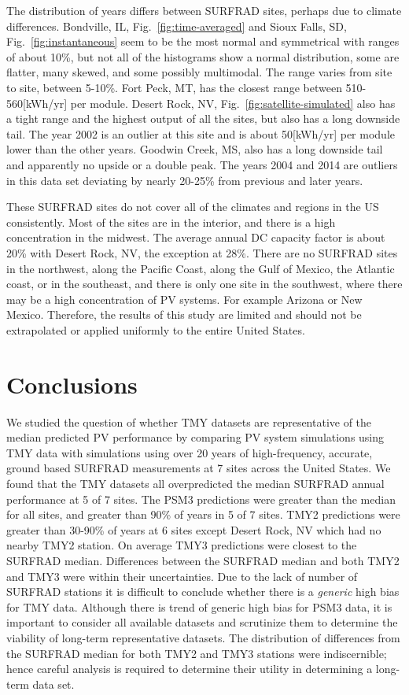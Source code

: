 \documentclass[conference]{IEEEtran}
\begin{document}
The distribution of years differs between SURFRAD sites, perhaps due to climate differences. Bondville, IL, Fig.~\ref{fig:time-averaged} and Sioux Falls, SD, Fig.~\ref{fig:instantaneous} seem to be the most normal and symmetrical with ranges of about 10\%, but not all of the histograms show a normal distribution, some are flatter, many skewed, and some possibly multimodal. The range varies from site to site, between 5-10\%. Fort Peck, MT, has the closest range between 510-560[kWh/yr] per module. Desert Rock, NV, Fig.~\ref{fig:satellite-simulated} also has a tight range and the highest output of all the sites, but also has a long downside tail. The year 2002 is an outlier at this site and is about 50[kWh/yr] per module lower than the other years. Goodwin Creek, MS, also has a long downside tail and apparently no upside or a double peak. The years 2004 and 2014 are outliers in this data set deviating by nearly 20-25\% from previous and later years.

These SURFRAD sites do not cover all of the climates and regions in the US consistently. Most of the sites are in the interior, and there is a high concentration in the midwest. The average annual DC capacity factor is about 20\% with Desert Rock, NV, the exception at 28\%. There are no SURFRAD sites in the northwest, along the Pacific Coast, along the Gulf of Mexico, the Atlantic coast, or in the southeast, and there is only one site in the southwest, where there may be a high concentration of PV systems. For example Arizona or New Mexico. Therefore, the results of this study are limited and should not be extrapolated or applied uniformly to the entire United States.

\section{Conclusions}
We studied the question of whether TMY datasets are representative of the median predicted PV performance by comparing PV system simulations using TMY data with simulations using over 20 years of high-frequency, accurate, ground based SURFRAD measurements at 7 sites across the United States. We found that the TMY datasets all overpredicted the median SURFRAD annual performance at 5 of 7 sites. The PSM3 predictions were greater than the median for all sites, and greater than 90\% of years in 5 of 7 sites. TMY2 predictions were greater than 30-90\% of years at 6 sites except Desert Rock, NV which had no nearby TMY2 station. On average TMY3 predictions were closest to the SURFRAD median. Differences between the SURFRAD median and both TMY2 and TMY3 were within their uncertainties. Due to the lack of number of SURFRAD stations it is difficult to conclude whether there is a \textit{generic} high bias for TMY data. Although there is trend of generic high bias for PSM3 data, it is important to consider all available datasets and scrutinize them to determine the viability of long-term representative datasets. The distribution of differences from the SURFRAD median for both TMY2 and TMY3 stations were indiscernible; hence careful analysis is required to determine their utility in determining a long-term data set.



\end{document}
